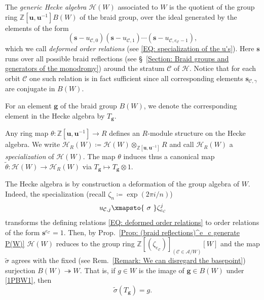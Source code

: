 \documentclass[ALCO, Unicode]{cedram}
\newcommand{\op}[1]{\operatorname{#1}}
\newcommand{\ZZ}{\mathbb{Z}}
\newcommand{\op}[1]{\operatorname{#1}}
\begin{document}
\begin{defi}\label{Defn: Hecke algebra}
The \emph{generic Hecke algebra} $\mathcal{H}(W)$ associated to $W$ is the quotient of the group ring $\ZZ[\bm u,\bm u^{-1}]B(W)$ of the braid group, over the ideal generated by the elements of the form \begin{equation}
(\bm s-u_{\mathcal{C},0})(\bm s-u_{\mathcal{C},1})\cdots (\bm s-u_{\mathcal{C},e_{\mathcal{C}}-1}),\label{EQ: deformed order relations}\end{equation}
which we call \emph{deformed order relations} \textup{(}see \eqref{EQ: specialization of the u's}\textup{)}. Here $\bm s$ runs over all possible braid reflections \textup{(}see \S~\ref{Section: Braid groups and generators of the monodromy}\textup{)} around the stratum $\mathcal{C}$ of $\mathcal{H}$. Notice that for each orbit $\mathcal{C}$ one such relation is in fact sufficient since all corresponding elements $\bm s_{\mathcal{C},\gamma}$ are conjugate in $B(W)$. 
\end{defi}

\begin{nota}
For an element $\bm g$ of the braid group $B(W)$, we denote the corresponding element in the Hecke algebra by $T_{\bm g}$.
\end{nota}

Any ring map $\theta:\ZZ[\bm u,\bm u^{-1}]\rightarrow R$ defines an $R$-module structure on the Hecke algebra. We write $\mathcal{H}_R(W)\coloneqq \mathcal{H}(W)\otimes_{\ZZ[\bm u,\bm u^{-1}]}R$ and call $\mathcal{H}_R(W)$  a {\it \color{blue} specialization} of $\mathcal{H}(W)$. The map $\theta$ induces thus a canonical map $\tilde{\theta}: \mathcal{H}(W)\rightarrow \mathcal{H}_R(W)$ via $T_{\bm g}\mapsto T_{\bm g}\otimes 1$. 

The Hecke algebra is by construction a deformation of the group algebra of $W$.  Indeed, the specialization (recall $\zeta_n\coloneqq \op{exp}(2\pi i /n)$) \begin{equation}
u_{\mathcal{C},j}\xmapsto{\displaystyle \ \sigma \ } \zeta_{e_{\mathcal{C}}}^j \label{EQ: specialization of the u's}\end{equation} transforms the defining relations \eqref{EQ: deformed order relations} to order relations of the form $\bm s^{e_{\mathcal{C}}}=1$. Then, by Prop.~\ref{Prop: (braid reflections)^e_c generate P(W)} $\mathcal{H}(W)$ reduces to the group ring $\ZZ[(\zeta_{e_{\mathcal{C}}})]_{(\mathcal{C}\in\mathcal{A}/W)}[W]$ and the map $\tilde{\sigma}$ agrees with the fixed (see Rem.~\ref{Remark: We can disregard the basepoint}) surjection $B(W)\twoheadrightarrow W$. That is, if $g\in W$ is the image of $\bm g\in B(W)$ under \eqref{1PBW1}, then $$\tilde{\sigma}(T_{\bm g})=g.$$
\end{document}
